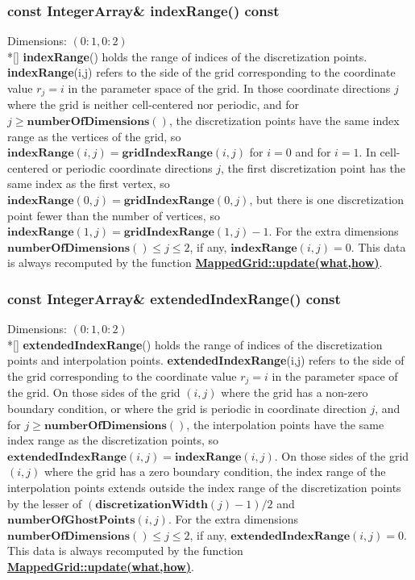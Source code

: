 \documentclass{article}
\begin{document}
  \subsubsection{const IntegerArray\& indexRange() const}
  \label{MappedGrid::indexRange()}
    Dimensions: $(0\colon1,0\colon2)$ \\*[\parskip]
    \textbf{indexRange}() holds the range of indices of the discretization points.
    \textbf{indexRange}(i,j) refers to the side of the grid corresponding to
    the coordinate value $r_j = i$ in the parameter space of the grid.
    In those coordinate directions $j$ where the grid is neither cell-centered nor
    periodic, and for $j\ge\textbf{numberOfDimensions}()$, the discretization points
    have the same index range as the vertices of the grid, so
    $\textbf{indexRange}(i,j) = \textbf{gridIndexRange}(i,j)$ for $i=0$ and
    for $i=1$.  In cell-centered or periodic coordinate directions $j$,
    the first discretization point has the same index as the first vertex, so
    $\textbf{indexRange}(0,j) = \textbf{gridIndexRange}(0,j)$, but there is
    one discretization point fewer than the number of vertices, so
    $\textbf{indexRange}(1,j) = \textbf{gridIndexRange}(1,j) - 1$.
    For the extra dimensions $\textbf{numberOfDimensions}()\le j \le 2$, if any, $\textbf{indexRange}(i,j)=0$.
    This data is always recomputed by the function
    {\bf{}\hyperref{update(what,how)}{update(what,how) \rm(\S}{)}{MappedGrid::update(what,how)}}.

  \subsubsection{const IntegerArray\& extendedIndexRange() const}
  \label{MappedGrid::extendedIndexRange()}
    Dimensions: $(0\colon1,0\colon2)$ \\*[\parskip]
    \textbf{extendedIndexRange}() holds the range of indices of the discretization points and interpolation points.
    \textbf{extendedIndexRange}(i,j) refers to the side of the grid corresponding to
    the coordinate value $r_j = i$ in the parameter space of the grid.
    On those sides of the grid $(i,j)$ where the grid has a non-zero boundary condition,
    or where the grid is periodic in coordinate direction $j$, and for
    $j\ge\textbf{numberOfDimensions}()$, the interpolation points
    have the same index range as the discretization points, so
    $\textbf{extendedIndexRange}(i,j) = \textbf{indexRange}(i,j)$.
    On those sides of the grid $(i,j)$ where the grid has a zero boundary condition, the index range of the
    interpolation points extends outside the index range of the discretization points by the lesser of
    $(\textbf{discretizationWidth}(j)-1)/2$ and $\textbf{numberOfGhostPoints}(i,j)$.
    For the extra dimensions $\textbf{numberOfDimensions}()\le j \le 2$, if any, $\textbf{extendedIndexRange}(i,j)=0$.
    This data is always recomputed by the function
    {\bf{}\hyperref{update(what,how)}{update(what,how) \rm(\S}{)}{MappedGrid::update(what,how)}}.
\end{document}

